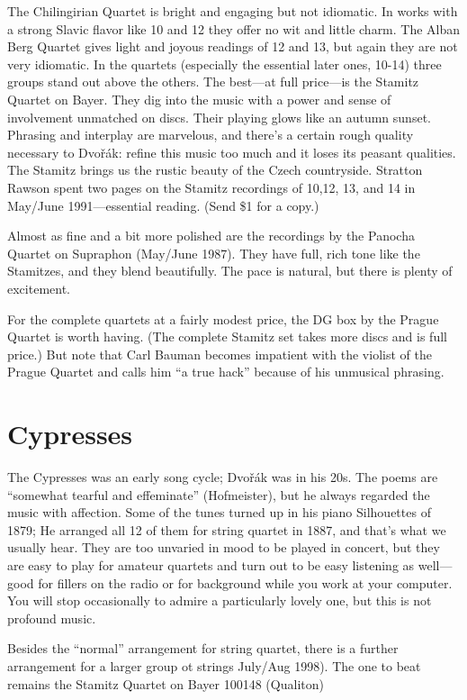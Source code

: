 \documentclass[12pt]{article}%
\begin{document}
The Chilingirian Quartet is bright and engaging but not idiomatic. In works with a strong Slavic flavor like 10 and 12 they offer no wit and little charm. The Alban Berg Quartet gives light and joyous readings of 12 and 13, but again they are not very idiomatic.
In the quartets (especially the essential later ones, 10-14) three groups stand out above the others. The best---at full price---is the Stamitz Quartet on Bayer. They dig into the music with a power and sense of involvement unmatched on discs. Their playing glows like an autumn sunset. Phrasing and interplay are marvelous, and there's a certain rough quality necessary to  Dvořák: refine this music too much and it loses its peasant qualities. The Stamitz brings us the rustic beauty of the Czech countryside. Stratton Rawson spent two pages on the Stamitz recordings of 10,12, 13, and 14 in May/June 1991---essential reading.
(Send \$1 for a copy.) 

Almost as fine and a bit more polished are the recordings by the Panocha Quartet on
Supraphon (May/June 1987). They have full, rich tone like the Stamitzes, and they blend beautifully. The pace is natural, but there is plenty of excitement.

For the complete quartets at a fairly modest price, the DG box by the Prague Quartet is worth having. (The complete Stamitz set takes more discs and is full price.) But note that Carl Bauman becomes impatient with the violist of the Prague Quartet and calls him ``a true hack'' because of his unmusical phrasing.

\section{Cypresses}

The Cypresses was an early song cycle;  Dvořák was in his 20s. The poems are ``somewhat tearful and effeminate'' (Hofmeister), but he always regarded the music with affection.
Some of the tunes turned up in his piano Silhouettes of 1879; He arranged all 12 of them for string quartet in 1887, and that's what we usually hear. They are too unvaried in mood to be played in concert, but they are easy to play for amateur quartets and turn out to be easy listening as well---good for fillers on the radio or for background while you work at your computer. You will stop occasionally to admire a particularly lovely one, but this is not profound music.

Besides the ``normal'' arrangement for string quartet, there is a further arrangement for a larger group ot strings July/Aug 1998).
The one to beat remains the Stamitz Quartet on Bayer 100148 (Qualiton)
\end{document}
